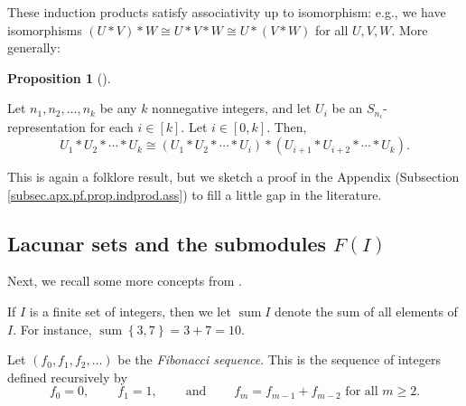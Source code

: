 \documentclass[numbers=enddot,12pt,final,onecolumn,notitlepage]{scrartcl}%
\theoremstyle{definition}
\newtheorem{prop}[theo]{Proposition}
\newenvironment{proposition}[1][]
{\begin{prop}[#1]\begin{leftbar}}
{\end{leftbar}\end{prop}}
\begin{document}
 These induction products satisfy associativity up to isomorphism: e.g., we
have isomorphisms
$\left(  U\ast V\right)  \ast W\cong U\ast V\ast W\cong U\ast\left(
V\ast W\right)  $ for all $U,V,W$. More generally:

\begin{proposition}
\label{prop.indprod.ass}Let $n_{1},n_{2},\ldots,n_{k}$ be any $k$ nonnegative
integers, and let $U_{i}$ be an $S_{n_{i}}$-representation for each
$i\in\left[  k\right]  $. Let $i\in\left[  0,k\right]  $. Then,%
\[
U_{1}\ast U_{2}\ast\cdots\ast U_{k}\cong\left(  U_{1}\ast U_{2}\ast\cdots\ast
U_{i}\right)  \ast\left(  U_{i+1}\ast U_{i+2}\ast\cdots\ast U_{k}\right)  .
\]

\end{proposition}

This is again a folklore result, but we sketch a proof in the Appendix
(Subsection \ref{subsec.apx.pf.prop.indprod.ass}) to fill a little gap in the literature.

\subsection{Lacunar sets and the submodules $F\left(  I\right)  $}

Next, we recall some more concepts from \cite{s2b1}.

If $I$ is a finite set of integers, then we let $\operatorname*{sum}I$ denote
the sum of all elements of $I$. For instance, $\operatorname*{sum}\left\{
3,7\right\}  =3+7=10$.

Let $\left(  f_{0},f_{1},f_{2},\ldots\right)  $ be the \emph{Fibonacci
sequence}. This is the sequence of integers defined recursively by%
\[
f_{0}=0,\ \ \ \ \ \ \ \ \ \ f_{1}=1,\ \ \ \ \ \ \ \ \ \ \text{and}%
\ \ \ \ \ \ \ \ \ \ f_{m}=f_{m-1}+f_{m-2}\text{ for all }m\geq2.
\]
\end{document}
